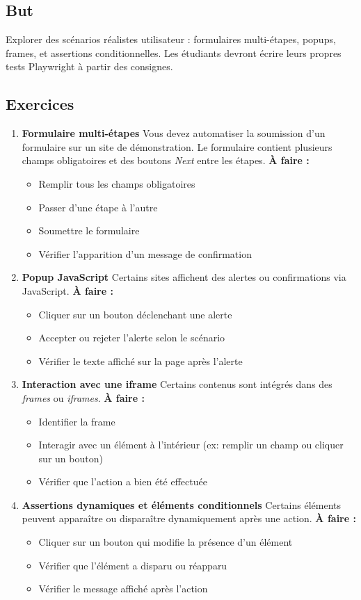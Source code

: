 \documentclass[a4paper,12pt]{article}
\begin{document}
\subsection*{But}
Explorer des scénarios réalistes utilisateur : formulaires multi-étapes, popups, frames, et assertions conditionnelles. Les étudiants devront écrire leurs propres tests Playwright à partir des consignes.

\subsection*{Exercices}
\begin{enumerate}
\item \textbf{Formulaire multi-étapes}  
Vous devez automatiser la soumission d’un formulaire sur un site de démonstration. Le formulaire contient plusieurs champs obligatoires et des boutons \textit{Next} entre les étapes.  
\textbf{À faire :}  
\begin{itemize}
\item Remplir tous les champs obligatoires
\item Passer d’une étape à l’autre
\item Soumettre le formulaire
\item Vérifier l’apparition d’un message de confirmation
\end{itemize}

\item \textbf{Popup JavaScript}  
Certains sites affichent des alertes ou confirmations via JavaScript.  
\textbf{À faire :}  
\begin{itemize}
\item Cliquer sur un bouton déclenchant une alerte
\item Accepter ou rejeter l’alerte selon le scénario
\item Vérifier le texte affiché sur la page après l’alerte
\end{itemize}

\item \textbf{Interaction avec une iframe}  
Certains contenus sont intégrés dans des \textit{frames} ou \textit{iframes}.  
\textbf{À faire :}  
\begin{itemize}
\item Identifier la frame
\item Interagir avec un élément à l’intérieur (ex: remplir un champ ou cliquer sur un bouton)
\item Vérifier que l’action a bien été effectuée
\end{itemize}

\item \textbf{Assertions dynamiques et éléments conditionnels}  
Certains éléments peuvent apparaître ou disparaître dynamiquement après une action.  
\textbf{À faire :}  
\begin{itemize}
\item Cliquer sur un bouton qui modifie la présence d’un élément
\item Vérifier que l’élément a disparu ou réapparu
\item Vérifier le message affiché après l’action
\end{itemize}
\end{enumerate}
\end{document}
